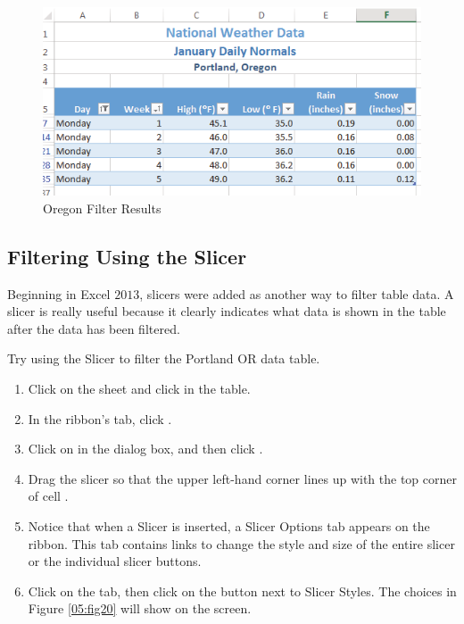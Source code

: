 \begin{figure}[H]
	\centering
	\includegraphics[width=\maxwidth{.95\linewidth}]{gfx/ch05_fig19}
	\caption{Oregon Filter Results}
	\label{05:fig19}
\end{figure}

\subsection{Filtering Using the Slicer}

Beginning in Excel $ 2013 $, slicers were added as another way to filter table data. A slicer is really useful because it clearly indicates what data is shown in the table after the data has been filtered.

Try using the Slicer to filter the Portland OR data table.

\begin{enumerate}
	\item Click on the  sheet and click in the table.
	\item In the ribbon's  tab, click .
	\item Click on  in the  dialog box, and then click .
	\item Drag the slicer so that the upper left-hand corner lines up with the top corner of cell .
	\item Notice that when a Slicer is inserted, a Slicer Options tab appears on the ribbon. This tab contains links to change the style and size of the entire slicer or the individual slicer buttons.
	\item Click on the  tab, then click on the  button next to Slicer Styles. The choices in Figure \ref{05:fig20} will show on the screen.
\end{enumerate}


